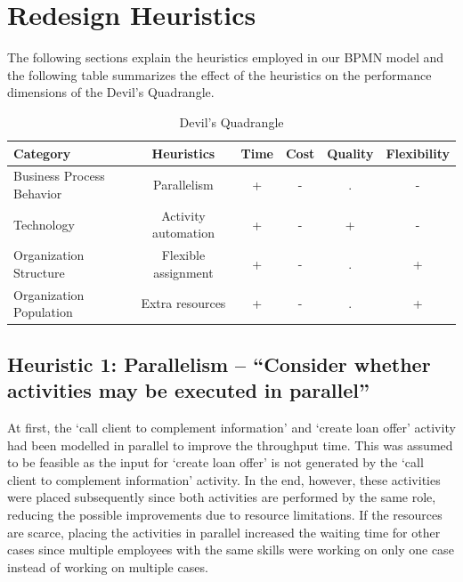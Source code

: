 \documentclass[a4paper]{article} %
\begin{document}
\section{Redesign Heuristics}
The following sections explain the heuristics employed in our BPMN model and the following table summarizes the effect of the heuristics on the performance dimensions of the Devil’s Quadrangle.

\begin{table}[H]
  \centering
  
    \begin{tabular}{|p{8.715em}|c|c|c|c|c|}
    \hline
    \textbf{Category} & \textbf{Heuristics} & \textbf{Time} & \textbf{Cost} & \textbf{Quality} & \textbf{Flexibility} \bigstrut\\
    \hline
    Business Process Behavior & Parallelism & +     & -     & .     & - \bigstrut\\
    \hline
    Technology & Activity automation & +     & -     & +     & - \bigstrut\\
    \hline
    Organization Structure & Flexible assignment & +     & -     & .     & + \bigstrut\\
    \hline
    Organization Population & Extra resources & +     & -     & .     & + \bigstrut\\
    \hline
    \end{tabular}%
  \label{tab:devils_qudrangle}%
  \caption{Devil's Quadrangle}
\end{table}%

\subsection{Heuristic 1: Parallelism – “Consider whether activities may be executed in parallel”}
At first, the ‘call client to complement information’ and ‘create loan offer’ activity had been modelled in parallel to improve the throughput time. This was assumed to be feasible as the input for ‘create loan offer’ is not generated by the ‘call client to complement information’ activity. In the end, however, these activities were placed subsequently since both activities are performed by the same role, reducing the possible improvements due to resource limitations. If the resources are scarce, placing the activities in parallel increased the waiting time for other cases since multiple employees with the same skills were working on only one case instead of working on multiple cases.
\end{document}
